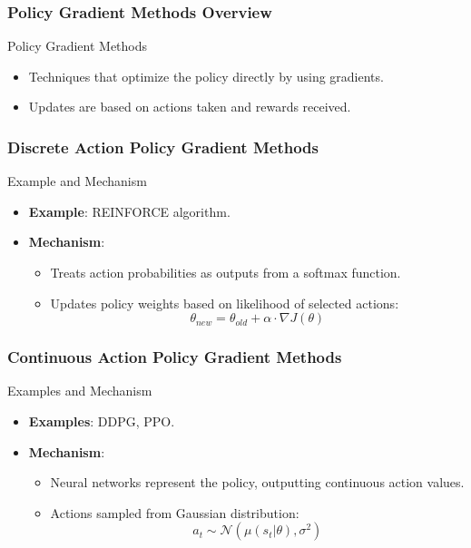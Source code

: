 \documentclass[aspectratio=169]{beamer}
\begin{document}
\begin{frame}[fragile]
    \frametitle{Policy Gradient Methods Overview}
    \begin{block}{Policy Gradient Methods}
        \begin{itemize}
            \item Techniques that optimize the policy directly by using gradients.
            \item Updates are based on actions taken and rewards received.
        \end{itemize}
    \end{block}
\end{frame}

\begin{frame}[fragile]
    \frametitle{Discrete Action Policy Gradient Methods}
    \begin{block}{Example and Mechanism}
        \begin{itemize}
            \item \textbf{Example}: REINFORCE algorithm.
            \item \textbf{Mechanism}:
            \begin{itemize}
                \item Treats action probabilities as outputs from a softmax function.
                \item Updates policy weights based on likelihood of selected actions:
                \begin{equation}
                \theta_{new} = \theta_{old} + \alpha \cdot \nabla J(\theta)
                \end{equation}
            \end{itemize}
        \end{itemize}
    \end{block}
\end{frame}

\begin{frame}[fragile]
    \frametitle{Continuous Action Policy Gradient Methods}
    \begin{block}{Examples and Mechanism}
        \begin{itemize}
            \item \textbf{Examples}: DDPG, PPO.
            \item \textbf{Mechanism}:
            \begin{itemize}
                \item Neural networks represent the policy, outputting continuous action values.
                \item Actions sampled from Gaussian distribution:
                \begin{equation}
                a_t \sim \mathcal{N}(\mu(s_t|\theta), \sigma^2)
                \end{equation}
            \end{itemize}
        \end{itemize}
    \end{block}
\end{frame}
\end{document}
